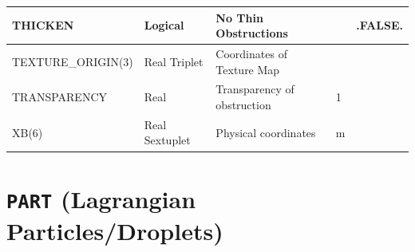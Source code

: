 \documentclass[11pt]{book}
\begin{document}
\begin{table}[H]
\begin{tabular*}{\textwidth}{@{\extracolsep{\fill}}|l|l|l|l|l|}
{\ct THICKEN}             & Logical             & No Thin Obstructions                  &    & {\ct .FALSE.} \\ \hline
{\ct TEXTURE\_ORIGIN(3)}  & Real Triplet        & Coordinates of Texture Map            &    &               \\ \hline
{\ct TRANSPARENCY}        & Real                & Transparency of obstruction           & 1  &               \\ \hline
{\ct XB(6) }              & Real Sextuplet      & Physical coordinates                  & m  &               \\ \hline
\end{tabular*}
\end{table}

\vspace{\baselineskip}

\vfill


\section{\texorpdfstring{{\tt PART}}{PART} (Lagrangian Particles/Droplets)}

\hspace{1in}
\end{document}
